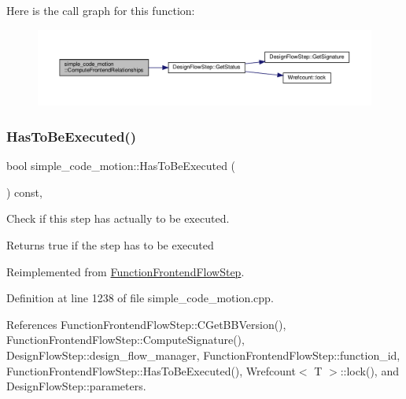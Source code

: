 Here is the call graph for this function\+:
\nopagebreak
\begin{figure}[H]
\begin{center}
\leavevmode
\includegraphics[width=350pt]{d5/d58/classsimple__code__motion_a2d0ecf0878e4d4c20f186b0096faf490_cgraph}
\end{center}
\end{figure}
\mbox{\label{classsimple__code__motion_a2b0b3e0ac4c9ad745ef690e183358c5f}} 
\subsubsection{\texorpdfstring{Has\+To\+Be\+Executed()}{HasToBeExecuted()}}
{\footnotesize\ttfamily bool simple\+\_\+code\+\_\+motion\+::\+Has\+To\+Be\+Executed (\begin{DoxyParamCaption}{ }\end{DoxyParamCaption}) const\hspace{0.3cm}{\ttfamily [override]}, {\ttfamily [virtual]}}



Check if this step has actually to be executed. 

\begin{DoxyReturn}{Returns}
true if the step has to be executed 
\end{DoxyReturn}


Reimplemented from \hyperlink{classFunctionFrontendFlowStep_a12e786363530aa9533e4bd9380130d75}{Function\+Frontend\+Flow\+Step}.



Definition at line 1238 of file simple\+\_\+code\+\_\+motion.\+cpp.



References Function\+Frontend\+Flow\+Step\+::\+C\+Get\+B\+B\+Version(), Function\+Frontend\+Flow\+Step\+::\+Compute\+Signature(), Design\+Flow\+Step\+::design\+\_\+flow\+\_\+manager, Function\+Frontend\+Flow\+Step\+::function\+\_\+id, Function\+Frontend\+Flow\+Step\+::\+Has\+To\+Be\+Executed(), Wrefcount$<$ T $>$\+::lock(), and Design\+Flow\+Step\+::parameters.

